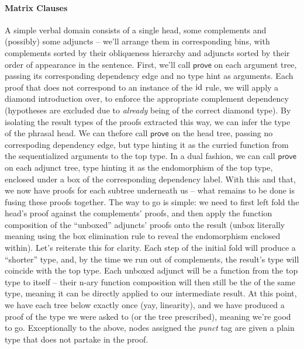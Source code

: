 \paragraph{Matrix Clauses}
A simple verbal domain consists of a single head, some complements and (possibly) some adjuncts  -- we'll arrange them in corresponding bins, with complements sorted by their obliqueness hierarchy and adjuncts sorted by their order of appearance in the sentence.
First, we'll call $\mathsf{prove}$ on each argument tree, passing its corresponding dependency edge and no type hint as arguments.
Each proof that does not correspond to an instance of the $\mathrm{id}$ rule, we will apply a diamond introduction over, to enforce the appropriate complement dependency (hypotheses are excluded due to \textit{already} being of the correct diamond type).
By isolating the result types of the proofs extracted this way, we can infer the type of the phrasal head.
We can thefore call $\mathsf{prove}$ on the head tree, passing no correspoding dependency edge, but type hinting it as the curried function from the sequentialized arguments to the top type.
In a dual fashion, we can call $\mathsf{prove}$ on each adjunct tree, type hinting it as the endomorphism of the top type, enclosed under a box of the corresponding dependency label.
With this and that, we now have proofs for each subtree underneath us -- what remains to be done is fusing these proofs together.
The way to go is simple: we need to first left fold the head's proof against the complements' proofs, and then apply the function composition of the ``unboxed'' adjuncts' proofs onto the result (unbox literally meaning using the box elimination rule to reveal the endomorphism enclosed within).
Let's reiterate this for clarity.
Each step of the initial fold will produce a ``shorter'' type, and, by the time we run out of complements, the result's type will coincide with the top type.
Each unboxed adjunct will be a function from the top type to itself -- their n-ary function composition will then still be the of the same type, meaning it can be directly applied to our intermediate result.
At this point, we have each tree below exactly once (yay, linearity), and we have produced a proof of the type we were asked to (or the tree prescribed), meaning we're good to go.
Exceptionally to the above, nodes assigned the \textit{punct} tag are given a plain  type that does not partake in the proof.

